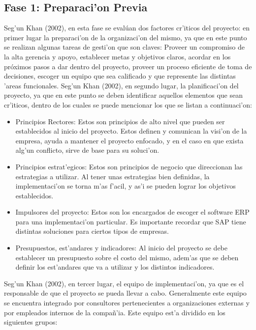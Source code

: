 \subsection{Fase 1: Preparaci'on Previa}
\indent Seg'un Khan (2002), en esta fase se evalúan dos factores cr'iticos del proyecto: en primer lugar la preparaci'on de la organizaci'on del mismo, ya que en este punto se realizan algunas tareas de gesti'on que son claves: Proveer un compromiso de la alta gerencia y apoyo, establecer metas y objetivos claros, acordar en los próximos pasos a dar dentro del proyecto, proveer un proceso eficiente de toma de decisiones, escoger un equipo que sea calificado y que represente las distintas 'areas funcionales.
\newline
\newline
\indent Seg'un Khan (2002), en segundo lugar, la planificaci'on del proyecto, ya que en este punto se deben identificar aquellos elementos que sean cr'iticos, dentro de los cuales se puede mencionar los que se listan a continuaci'on:
\begin{itemize}
\item Principios Rectores: Estos son principios de alto nivel que pueden ser establecidos al inicio del proyecto. Estos definen y comunican la visi'on de la empresa, ayuda a mantener el proyecto enfocado, y en el caso en que exista alg'un conflicto, sirve de base para su soluci'on. 
\item Principios estrat'egicos:  Estos son principios de negocio que direccionan las estrategias a utilizar. Al tener unas estrategias bien definidas, la implementaci'on se torna m'as f'acil, y as'i se pueden lograr los objetivos establecidos.
\item Impulsores del proyecto: Estos son los encargados de escoger el software ERP para una implementaci'on particular. Es importante recordar que SAP tiene distintas soluciones para ciertos tipos de empresas. 
\item Presupuestos, est'andares y indicadores: Al inicio del proyecto se debe establecer un presupuesto sobre el costo del mismo, adem'as que se deben definir los est'andares que va a utilizar y los distintos indicadores.
\end{itemize}
Seg'un Khan (2002), en tercer lugar, el equipo de implementaci'on, ya que es el responsable de que el proyecto se pueda llevar a cabo. Generalmente este equipo se encuentra integrado por consultores pertenecientes a organizaciones externas y por empleados internos de la compa\~n'ia. Este equipo est'a dividido en los siguientes grupos:
